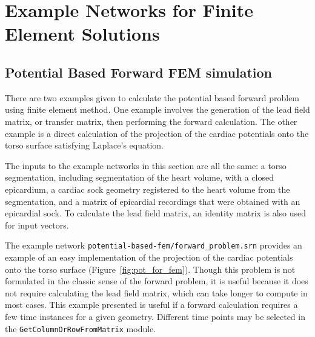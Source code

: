 \section{Example Networks for Finite Element Solutions}

\subsection{Potential Based Forward FEM simulation}
\label{sec:pot_for_fem}

There are two examples given to calculate the potential based forward problem using finite element method.  One example involves the generation of the lead field matrix, or transfer matrix, then performing the forward calculation.  The other example is a direct calculation of the projection of the cardiac potentials onto the torso surface satisfying Laplace's equation.  

The inputs to the example networks in this section are all the same:  a torso segmentation, including segmentation of the heart volume, with a closed epicardium, a cardiac sock geometry registered to the heart volume from the segmentation, and a matrix of epicardial recordings that were obtained with an epicardial sock.  To calculate the lead field matrix, an identity matrix is also used for input vectors.

The example network {\tt potential-based-fem/forward\_problem.srn} provides an example of an easy implementation of the projection of the cardiac potentials onto the torso surface (Figure~\ref{fig:pot_for_fem}).  Though this problem is not formulated in the classic sense of the forward problem, it is useful because it does not require calculating the lead field matrix, which can take longer to compute in most cases.  This example presented is useful if a forward calculation requires a few time instances for a given geometry. Different time points may be selected in the {\tt GetColumnOrRowFromMatrix} module.

